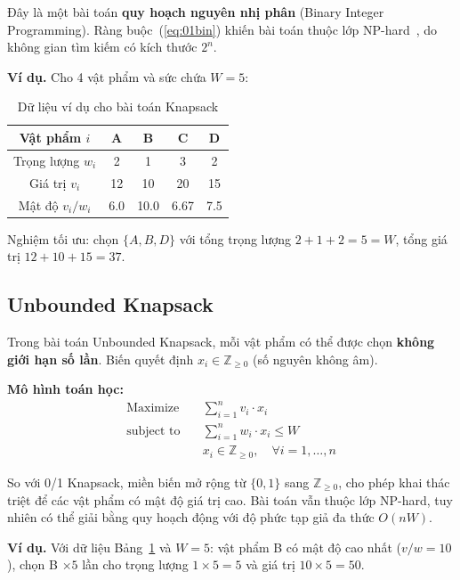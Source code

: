 \documentclass[fontsize=13pt,a4paper]{report}
\begin{document}
Đây là một bài toán \textbf{quy hoạch nguyên nhị phân} (Binary Integer Programming). Ràng buộc~(\ref{eq:01bin}) khiến bài toán thuộc lớp NP-hard~\cite{karp1972reducibility}, do không gian tìm kiếm có kích thước $2^n$.

\textbf{Ví dụ.} Cho 4 vật phẩm và sức chứa $W = 5$:

\begin{table}[H]
\centering
\begin{tabular}{c|cccc}
\toprule
Vật phẩm $i$ & A & B & C & D \\
\midrule
Trọng lượng $w_i$ & 2 & 1 & 3 & 2 \\
Giá trị $v_i$ & 12 & 10 & 20 & 15 \\
Mật độ $v_i/w_i$ & 6.0 & 10.0 & 6.67 & 7.5 \\
\bottomrule
\end{tabular}
\caption{Dữ liệu ví dụ cho bài toán Knapsack}
\label{tab:example_items}
\end{table}

Nghiệm tối ưu: chọn $\{A, B, D\}$ với tổng trọng lượng $2+1+2=5 = W$, tổng giá trị $12+10+15 = 37$.


\subsection{Unbounded Knapsack}

Trong bài toán Unbounded Knapsack, mỗi vật phẩm có thể được chọn \textbf{không giới hạn số lần}. Biến quyết định $x_i \in \mathbb{Z}_{\geq 0}$ (số nguyên không âm).

\textbf{Mô hình toán học:}
\begin{align}
    \text{Maximize} \quad & \sum_{i=1}^{n} v_i \cdot x_i \label{eq:ubobj} \\
    \text{subject to} \quad & \sum_{i=1}^{n} w_i \cdot x_i \leq W \label{eq:ubcap} \\
    & x_i \in \mathbb{Z}_{\geq 0}, \quad \forall i = 1, \ldots, n \label{eq:ubint}
\end{align}

So với 0/1 Knapsack, miền biến mở rộng từ $\{0,1\}$ sang $\mathbb{Z}_{\geq 0}$, cho phép khai thác triệt để các vật phẩm có mật độ giá trị cao. Bài toán vẫn thuộc lớp NP-hard, tuy nhiên có thể giải bằng quy hoạch động với độ phức tạp giả đa thức $O(nW)$.

\textbf{Ví dụ.} Với dữ liệu Bảng~\ref{tab:example_items} và $W=5$: vật phẩm B có mật độ cao nhất ($v/w = 10$), chọn B $\times 5$ lần cho trọng lượng $1 \times 5 = 5$ và giá trị $10 \times 5 = 50$.
\end{document}
